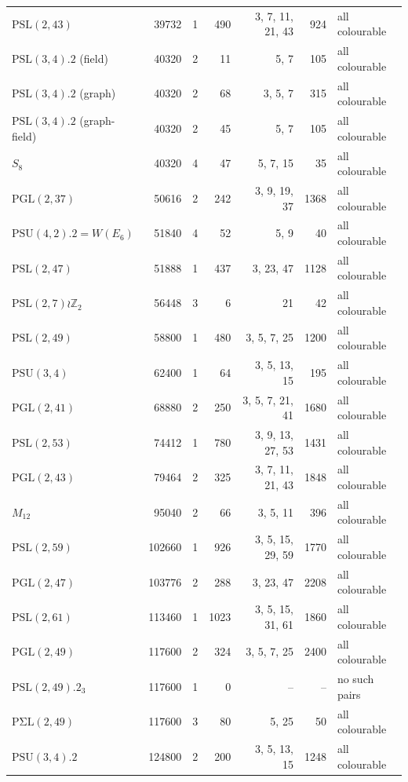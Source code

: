 \begin{tabular}{@{}lrrrrrl@{}}
$\mathrm{PSL}(2,43)$ & 39732 & 1 & 490 & 3, 7, 11, 21, 43 & 924 & all colourable\\
$\mathrm{PSL}(3,4).2$ (field) & 40320 & 2 & 11 & 5, 7 & 105 & all colourable\\
$\mathrm{PSL}(3,4).2$ (graph) & 40320 & 2 & 68 & 3, 5, 7 & 315 & all colourable\\
$\mathrm{PSL}(3,4).2$ (graph-field) & 40320 & 2 & 45 & 5, 7 & 105 & all colourable\\
$S_8$ & 40320 & 4 & 47 & 5, 7, 15 & 35 & all colourable\\
$\mathrm{PGL}(2,37)$ & 50616 & 2 & 242 & 3, 9, 19, 37 & 1368 & all colourable\\
$\mathrm{PSU}(4,2).2=W(E_6)$ & 51840 & 4 & 52 & 5, 9 & 40 & all colourable\\
$\mathrm{PSL}(2,47)$ & 51888 & 1 & 437 & 3, 23, 47 & 1128 & all colourable\\
$\mathrm{PSL}(2,7)\wr\mathbb{Z}_2$ & 56448 & 3 & 6 & 21 & 42 & all colourable\\
$\mathrm{PSL}(2,49)$ & 58800 & 1 & 480 & 3, 5, 7, 25 & 1200 & all colourable\\
$\mathrm{PSU}(3,4)$ & 62400 & 1 & 64 & 3, 5, 13, 15 & 195 & all colourable\\
$\mathrm{PGL}(2,41)$ & 68880 & 2 & 250 & 3, 5, 7, 21, 41 & 1680 & all colourable\\
$\mathrm{PSL}(2,53)$ & 74412 & 1 & 780 & 3, 9, 13, 27, 53 & 1431 & all colourable\\
$\mathrm{PGL}(2,43)$ & 79464 & 2 & 325 & 3, 7, 11, 21, 43 & 1848 & all colourable\\
$M_{12}$ & 95040 & 2 & 66 & 3, 5, 11 & 396 & all colourable\\
$\mathrm{PSL}(2,59)$ & 102660 & 1 & 926 & 3, 5, 15, 29, 59 & 1770 & all colourable\\
$\mathrm{PGL}(2,47)$ & 103776 & 2 & 288 & 3, 23, 47 & 2208 & all colourable\\
$\mathrm{PSL}(2,61)$ & 113460 & 1 & 1023 & 3, 5, 15, 31, 61 & 1860 & all colourable\\
$\mathrm{PGL}(2,49)$ & 117600 & 2 & 324 & 3, 5, 7, 25 & 2400 & all colourable\\
$\mathrm{PSL}(2,49).2_3$ & 117600 & 1 & 0 & -- & -- & no such pairs\\
$\mathrm{P\Sigma L}(2,49)$ & 117600 & 3 & 80 & 5, 25 & 50 & all colourable\\
$\mathrm{PSU}(3,4).2$ & 124800 & 2 & 200 & 3, 5, 13, 15 & 1248 & all colourable\\

\end{tabular}
